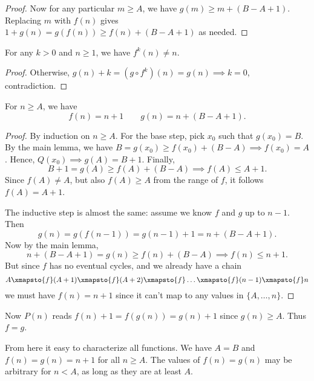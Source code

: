 \documentclass[11pt,twoside]{scrartcl}
\begin{document}
\begin{soln}
\begin{proof}
	Now for any particular $m \ge A$, we have $g(m) \ge m+(B-A+1)$.
	Replacing $m$ with $f(n)$ gives
	$1 + g(n) = g(f(n)) \ge f(n) + (B-A+1)$ as needed.
\end{proof}

\begin{claim*}
	For any $k > 0$ and $n \ge 1$,
	we have $f^k(n) \neq n$.
\end{claim*}
\begin{proof}
	Otherwise, $g(n) + k = (g \circ f^k)(n) = g(n) \implies k = 0$, contradiction.
\end{proof}

\begin{claim*}
	For $n \ge A$, we have
	\[ f(n) = n+1 \qquad g(n) = n+(B-A+1). \]
\end{claim*}
\begin{proof}
	By induction on $n \ge A$.
	For the base step, pick $x_0$ such that $g(x_0) = B$.
	By the main lemma, we have
	$B = g(x_0) \ge f(x_0) + (B-A) \implies f(x_0) = A$.
	Hence, $Q(x_0) \implies g(A) = B+1$.
	Finally,
	\[ B+1 = g(A) \ge f(A) + (B-A) \implies f(A) \le A+1. \]
	Since $f(A) \neq A$, but also $f(A) \ge A$ from the range of $f$,
	it follows $f(A) = A+1$.

	The inductive step is almost the same:
	assume we know $f$ and $g$ up to $n-1$.
	Then
	\[ g(n) = g(f(n-1)) = g(n-1) + 1 = n + (B-A+1). \]
	Now by the main lemma,
	\[ n + (B-A+1) = g(n) \ge f(n) + (B-A) \implies f(n) \le n+1. \]
	But since $f$ has no eventual cycles,
	and we already have a chain
	\[ A \xmapsto{f} (A+1) \xmapsto{f} (A+2)
		\xmapsto{f} \dots \xmapsto{f} (n-1) \xmapsto{f} n \]
	we must have $f(n) = n+1$ since
	it can't map to any values in $\{A , \dots, n\}$.
\end{proof}

Now $P(n)$ reads $f(n)+1 = f(g(n)) = g(n)+1$ since $g(n) \ge A$.
Thus $f = g$.

\begin{remark*}
	From here it easy to characterize all functions.
	We have $A=B$ and $f(n) = g(n) = n+1$ for all $n \ge A$.
	The values of $f(n) = g(n)$ may be arbitrary for $n < A$,
	as long as they are at least $A$.
\end{remark*}
    \end{soln}
\end{document}
